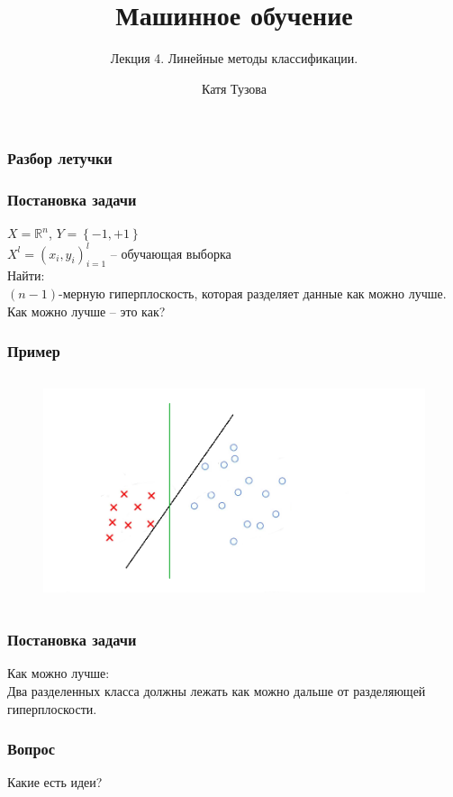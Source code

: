 \documentclass[12pt]{beamer}
\author{Катя Тузова}
\title{Машинное обучение}
\subtitle{Лекция 4. Линейные методы классификации.}
\date{}
\begin{document}
	
\frame{\titlepage}

\begin{frame}\frametitle{Разбор летучки}
\end{frame}


\begin{frame}\frametitle{Постановка задачи}
$X = \mathbb{R}^n$, ${Y = \left\{ -1, + 1\right\}}$\\
${X^l = (x_i, y_i)_{i = 1}^l}$ -- обучающая выборка\\
\vspace{5mm}Найти:\\
$(n-1)$-мерную гиперплоскость, которая разделяет данные как можно лучше.
\\ \vspace{5mm}
Как можно лучше -- это как?

\end{frame}

\begin{frame}\frametitle{Пример}
\begin{figure}[htbp]
  \includegraphics[height=190pt, keepaspectratio = true]{images/example}   
\end{figure}
\end{frame}

\begin{frame}\frametitle{Постановка задачи}
Как можно лучше:\\
Два разделенных класса должны лежать как можно дальше от разделяющей гиперплоскости.\\
\end{frame}

\begin{frame}\frametitle{Вопрос}
Какие есть идеи?
\end{frame}
\end{document}
